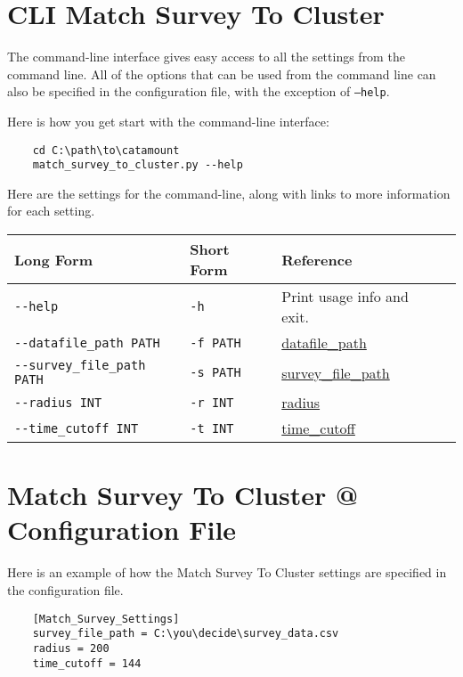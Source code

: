 \section{CLI Match Survey To Cluster}

The command-line interface gives easy access to all the settings from
the command line. All of the options that can be used from the command
line can also be specified in the configuration file, with the
exception of \texttt{--help}.

Here is how you get start with the command-line interface:

\begin{verbatim}
    cd C:\path\to\catamount
    match_survey_to_cluster.py --help
\end{verbatim}

Here are the settings for the command-line, along with links to more
information for each setting.

\begin{table}[h]
\begin{tabular}{|l|l|l|l|}
  \hline
  Long Form & Short Form & Reference \\ \hline \hline

  \verb=--help= & \verb=-h= & Print usage info and exit. \\ \hline
  \verb=--datafile_path PATH= & \verb=-f PATH= & \hyperlink{global-datafile-path}{datafile\_path} \\ \hline
  \verb=--survey_file_path PATH= & \verb=-s PATH= & \hyperlink{survey-to-cluster-survey-file-path}{survey\_file\_path} \\ \hline
  \verb=--radius INT= & \verb=-r INT= & \hyperlink{survey-to-cluster-radius}{radius} \\ \hline
  \verb=--time_cutoff INT= & \verb=-t INT= & \hyperlink{survey-to-cluster-time-cutoff}{time\_cutoff} \\ \hline

\end{tabular}
\end{table}

\FloatBarrier

\section{Match Survey To Cluster @ Configuration File}

Here is an example of how the Match Survey To Cluster settings are specified
in the configuration file.

\begin{verbatim}
    [Match_Survey_Settings]
    survey_file_path = C:\you\decide\survey_data.csv
    radius = 200
    time_cutoff = 144
\end{verbatim}
